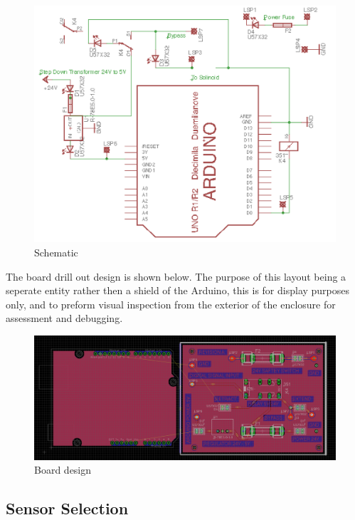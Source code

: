 \documentclass[a4paper, 10pt]{IEEEconf}
\begin{document}
\begin{figure}[H]
  \includegraphics[width=\linewidth]{images/Schematic}
  \caption{Schematic}
  \label{fig:Schematic}
\end{figure}

The board drill out design is shown below. The purpose of this layout being a seperate entity rather then a shield of the Arduino, this is for display purposes only, and to preform visual inspection from the exterior of the enclosure for assessment and debugging. 

\begin{figure}[H]
  \includegraphics[width=\linewidth]{images/Board}
  \caption{Board design}
  \label{fig:Board design}
\end{figure}


\subsection{Sensor Selection}
\end{document}
